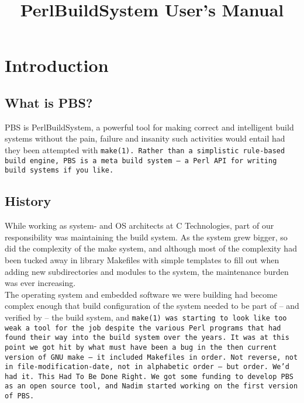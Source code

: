 \title{PerlBuildSystem User's Manual}

\tableofcontents

\section{Introduction}
\subsection{What is PBS?}
PBS is PerlBuildSystem, a powerful tool for making correct and intelligent build systems
without the pain, failure and insanity such activities would entail had they been attempted with
\tt{make(1)}. Rather than a simplistic rule-based build engine, PBS is a meta build system
-- a Perl API for writing build systems if you like.
\subsection{History}
While working as system- and OS architects at C Technologies, part of our responsibility
was maintaining the build system. As the system grew bigger, so did the complexity of
the make system, and although most of the complexity had been tucked away in library
Makefiles with simple templates to fill out when adding new subdirectories and modules
to the system, the maintenance burden was ever increasing.
\\
The operating system and embedded
software we were building had become complex enough that build configuration of the system
needed to be part of -- and verified by -- the build system, and \tt{make(1)} was starting
to look like too weak a tool for the job despite the various Perl programs that had found
their way into the build system over the years. It was at this point we got hit by what
must have been a bug in the then current version of GNU make -- it \tt{include}d Makefiles
in  order. Not reverse, not in file-modification-date, not in alphabetic
order -- but  order. We'd had it. This Had To Be Done Right\trademark.
We got some funding to develop PBS as an open source tool, and Nadim started working on the
first version of PBS.
